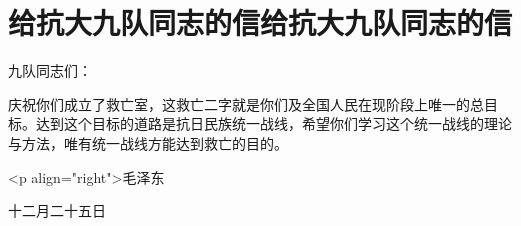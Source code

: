 \section[给抗大九队同志的信给抗大九队同志的信]{给抗大九队同志的信给抗大九队同志的信}


九队同志们：

庆祝你们成立了救亡室，这救亡二字就是你们及全国人民在现阶段上唯一的总目标。达到这个目标的道路是抗日民族统一战线，希望你们学习这个统一战线的理论与方法，唯有统一战线方能达到救亡的目的。

<p align="right">毛泽东

 十二月二十五日

